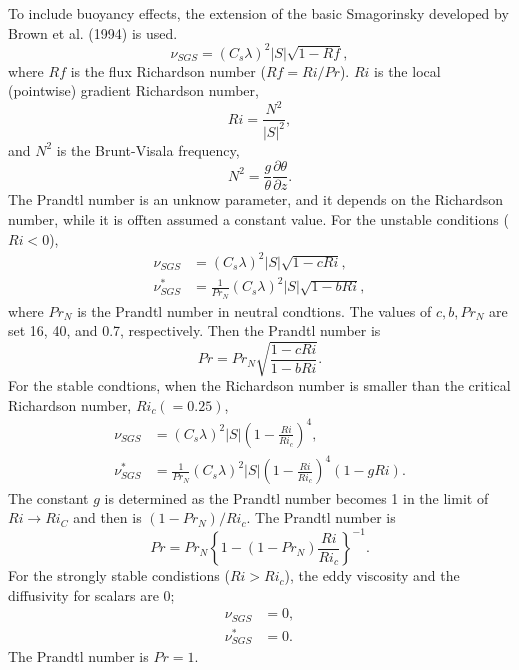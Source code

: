 To include buoyancy effects,
the extension of the basic Smagorinsky developed by Brown et al. (1994)
is used.
\begin{equation}
  \nu_{SGS} = (C_s\lambda)^2 |S| \sqrt{1-Rf},
\end{equation}
where $Rf$ is the flux Richardson number ($Rf = Ri/Pr$).
$Ri$ is the local (pointwise) gradient Richardson number,
\begin{equation}
  Ri = \frac{N^2}{|S|^2},
  \label{eq:Ri}
\end{equation}
and $N^2$ is the Brunt-Visala frequency,
\begin{equation}
  N^2 = \frac{g}{\theta}\frac{\partial\theta}{\partial z}.
  \label{eq:N^2}
\end{equation}
The Prandtl number is an unknow parameter,
and it depends on the Richardson number,
while it is offten assumed a constant value.
For the unstable conditions ($Ri < 0$),
\begin{align}
  \nu_{SGS} &= \left(C_s\lambda\right)^2 |S| \sqrt{1 - c Ri}, \label{eq:nu unstable} \\
  \nu^*_{SGS} &= \frac{1}{Pr_N} \left(C_s\lambda\right)^2 |S| \sqrt{1 - b Ri} \label{eq:nu^* unstable},
\end{align}
where $Pr_N$ is the Prandtl number in neutral condtions.
The values of $c, b, Pr_N$ are set 16, 40, and 0.7, respectively.
Then the Prandtl number is
\begin{equation}
  Pr = Pr_N \sqrt{\frac{1-c Ri}{1-b Ri}}.
\end{equation}
For the stable condtions,
when the Richardson number is smaller than the critical Richardson number, $Ri_c (=0.25)$,
\begin{align}
  \nu_{SGS} &= \left(C_s\lambda\right)^2 |S| \left(1-\frac{Ri}{Ri_c}\right)^4, \label{eq:nu stable} \\
  \nu^*_{SGS} &= \frac{1}{Pr_N}\left(C_s\lambda\right)^2 |S| \left(1-\frac{Ri}{Ri_c}\right)^4\left(1-g Ri\right). \label{eq:nu^* stable}
\end{align}
The constant $g$ is determined as the Prandtl number becomes 1
in the limit of $Ri \to Ri_C$ and then is $(1-Pr_N)/Ri_c$.
The Prandtl number is
\begin{equation}
  Pr = Pr_N \left\{1-(1-Pr_N)\frac{Ri}{Ri_c}\right\}^{-1}.
\end{equation}
For the strongly stable condistions ($Ri > Ri_c$),
the eddy viscosity and the diffusivity for scalars are 0;
\begin{align}
  \nu_{SGS} &= 0, \label{eq:nu strong stable} \\
  \nu^*_{SGS} &= 0. \label{eq:nu^* strong stable}
\end{align}
The Prandtl number is $Pr = 1$.


